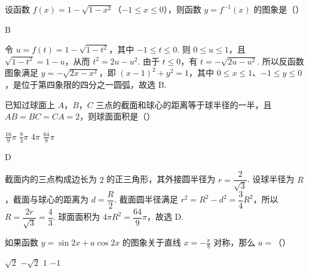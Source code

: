 \documentclass[UTF8,a4paper,oneside,11pt]{ctexbook}
\begin{document}
\begin{problem}
设函数 \(f(x) = 1 - \sqrt{1 - x^2}\)（\(-1 \leqslant x \leqslant 0\)），则函数 \(y = f^{-1}(x)\) 的图象是（\quad）

\choices
    {}
    {}
    {}
    {}
\end{problem}

\begin{answer}
B
\end{answer}

\begin{solution}
令 \(u=f(t)=1-\sqrt{1-t^2}\)，其中 \(-1\leqslant t\leqslant0\). 则 \(0\leqslant u\leqslant1\)，且 \(\sqrt{1-t^2}=1-u\)，从而 \(t^2=2u-u^2\). 由于 \(t\leqslant0\)，有 \(t=-\sqrt{2u-u^2}\). 所以反函数图象满足 \(y=-\sqrt{2x-x^2}\)，即 \((x-1)^2+y^2=1\)，其中 \(0\leqslant x\leqslant1\)、\(-1\leqslant y\leqslant0\)，是位于第四象限的四分之一圆弧，故选 B.
\end{solution}

\begin{problem}
已知过球面上 \(A\)，\(B\)，\(C\) 三点的截面和球心的距离等于球半径的一半，且 \(AB = BC = CA = 2\)，则球面面积是（\quad）

\choices
    {\(\frac{16}{9}\pi\)}
    {\(\frac{8}{3}\pi\)}
    {\(4\pi\)}
    {\(\frac{64}{9}\pi\)}
\end{problem}

\begin{answer}
D
\end{answer}

\begin{solution}
截面内的三点构成边长为 \(2\) 的正三角形，其外接圆半径为 \(r=\dfrac{2}{\sqrt3}\). 设球半径为 \(R\)，截面与球心的距离为 \(d=\dfrac R2\). 截面圆半径满足 \(r^2=R^2-d^2=\dfrac34R^2\)，所以 \(R=\dfrac{2r}{\sqrt3}=\dfrac43\). 球面面积为 \(4\pi R^2=\dfrac{64}{9}\pi\)，故选 D.
\end{solution}

\begin{problem}
如果函数 \(y = \sin 2x + a \cos 2x \) 的图象关于直线 \(x = -\frac{\pi}{8} \) 对称，那么 \(a =\)（\quad）

\choices
    {\(\sqrt{2}\)}
    {\(-\sqrt{2}\)}
    {\(1\)}
    {\(-1\)}
\end{problem}
\end{document}
